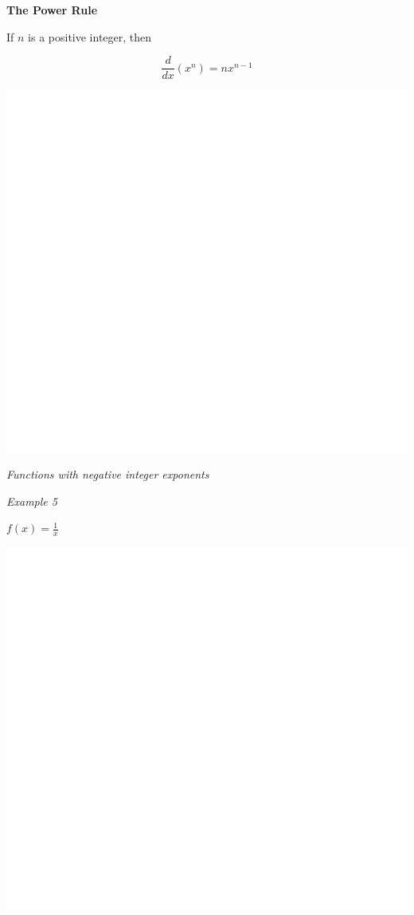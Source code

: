 \documentclass[]{book}
\begin{document}
\textbf{The Power Rule}

If \(n\) is a positive integer, then

\[\frac{d}{dx}(x^n)=nx^{n-1}\]

\begin{center}\includegraphics[width=1\linewidth]{figure/LB7-1} \end{center}

\emph{Functions with negative integer exponents}

\emph{Example 5}

\(f(x)=\frac{1}{x}\)

\begin{center}\includegraphics[width=1\linewidth]{figure/LB8-1} \end{center}
\end{document}

